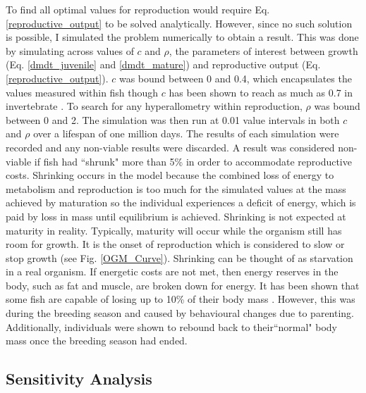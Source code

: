 \documentclass[a4paper, 11pt, hidelinks]{article} %
\begin{document}
	To find all optimal values for reproduction would require Eq. \ref{reproductive_output} to be solved analytically.  However, since no such solution is possible, I simulated the problem numerically to obtain a result.  This was done by simulating across values of $ c $ and $ \rho $, the parameters of interest between growth (Eq. \ref{dmdt_juvenile} and \ref{dmdt_mature}) and reproductive output (Eq. \ref{reproductive_output}).  $ c $ was bound between 0 and 0.4, which encapsulates the values measured within fish \parencite{Benoit2018, Roff1983, Fontoura2009, Lambert2000, Wootton1985} though $ c $ has been shown to reach as much as 0.7 in invertebrate \parencite{Parker2018}.  To search for any hyperallometry within reproduction, $ \rho $ was bound between 0 and 2.  
	The simulation was then run at 0.01 value intervals in both $c$ and $\rho$ over a lifespan of one million days.  The results of each simulation were recorded and any non-viable results were discarded.  A result was considered non-viable if fish had ``shrunk" more than 5\% in order to accommodate reproductive costs.  Shrinking occurs in the model because  the combined loss of energy to metabolism and reproduction is too much for the simulated values at the mass achieved by maturation so the individual experiences a deficit of energy, which is paid by loss in mass until equilibrium is achieved. %
	Shrinking is not expected at maturity in reality.  Typically, maturity will occur while the organism still has room for growth.  It is the onset of reproduction which is considered to slow or stop growth %
	(see Fig. \ref{OGM_Curve}).  Shrinking can be thought of as starvation in a real organism.  If energetic costs are not met, then energy reserves in the body, such as fat and muscle, are broken down for energy.  It has been shown that some fish are capable of losing up to 10\% of their body mass \parencite{VandenBerghe1992}.  However, this was during the breeding season and caused by behavioural changes due to parenting.  Additionally, individuals were shown to rebound back to their``normal" body mass once the breeding season had ended. %

	
	\subsection{Sensitivity Analysis}
\end{document}
